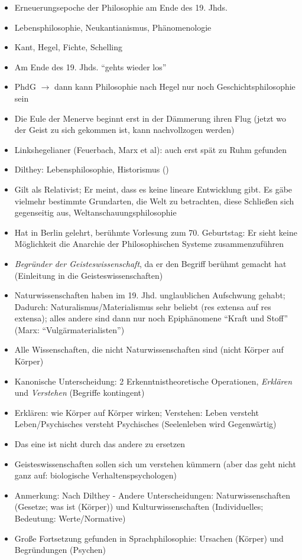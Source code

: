 \documentclass[emulatestandardclasses]{scrartcl}
\begin{document}
\begin{itemize}
  \item Erneuerungsepoche der Philosophie am Ende des 19. Jhds.
  \item Lebensphilosophie, Neukantianismus, Phänomenologie
  \item Kant, Hegel, Fichte, Schelling
  \item Am Ende des 19. Jhds. "`gehts wieder los"'
  \item PhdG $\rightarrow$ dann kann Philosophie nach Hegel nur noch Geschichtsphilosophie sein
  \item Die Eule der Menerve beginnt erst in der Dämmerung ihren Flug (jetzt wo der Geist zu sich gekommen ist, kann nachvollzogen werden)
  \item Linkshegelianer (Feuerbach, Marx et al): auch erst spät zu Ruhm gefunden
  \item Dilthey: Lebensphilosophie, Historismus ()
  \item Gilt als Relativist; Er meint, dass es keine lineare Entwicklung gibt. Es gäbe vielmehr bestimmte Grundarten, die Welt zu betrachten, diese Schließen sich gegenseitig aus, Weltanschauungsphilosophie
  \item Hat in Berlin gelehrt, berühmte Vorlesung zum 70. Geburtstag: Er sieht keine Möglichkeit die Anarchie der Philosophischen Systeme zusammenzuführen
  \item \emph{Begründer der Geisteswissenschaft}, da er den Begriff berühmt gemacht hat (Einleitung in die Geisteswissenschaften)
  \item Naturwissenschaften haben im 19. Jhd. unglaublichen Aufschwung gehabt; Dadurch: Naturalismus/Materialismus sehr beliebt (res extensa auf res extensa); alles andere sind dann nur noch Epiphänomene "`Kraft und Stoff"' (Marx: "`Vulgärmaterialisten"')
  \item Alle Wissenschaften, die nicht Naturwissenschaften sind (nicht Körper auf Körper)
  \item Kanonische Unterscheidung: 2 Erkenntnistheoretische Operationen, \emph{Erklären} und \emph{Verstehen} (Begriffe kontingent)
  \item Erklären: wie Körper auf Körper wirken; Verstehen: Leben versteht Leben/Psychisches versteht Psychisches (Seelenleben wird Gegenwärtig)
  \item Das eine ist nicht durch das andere zu ersetzen
  \item Geisteswissenschaften sollen sich um verstehen kümmern (aber das geht nicht ganz auf: biologische Verhaltenspsychologen)
  \item Anmerkung: Nach Dilthey - Andere Unterscheidungen: Naturwissenschaften (Gesetze; was ist (Körper)) und Kulturwissenschaften (Individuelles; Bedeutung: Werte/Normative)
  \item Große Fortsetzung gefunden in Sprachphilosophie: Ursachen (Körper) und Begründungen (Psychen)
\end{itemize}
\end{document}
